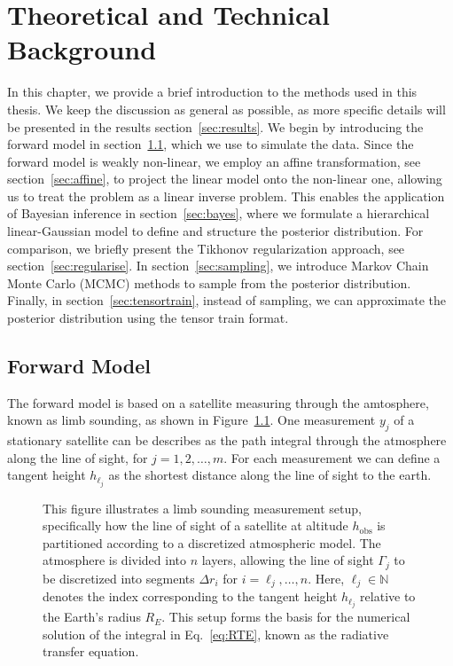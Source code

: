 \chapter{Theoretical and Technical Background}
\label{ch:background}
In this chapter, we provide a brief introduction to the methods used in this thesis. We keep the discussion as general as possible, as more specific details will be presented in the results section~\ref{sec:results}.
We begin by introducing the forward model in section~\ref{sec:formodel}, which we use to simulate the data. Since the forward model is weakly non-linear, we employ an affine transformation, see section~\ref{sec:affine}, to project the linear model onto the non-linear one, allowing us to treat the problem as a linear inverse problem.
This enables the application of Bayesian inference in section~\ref{sec:bayes}, where we formulate a hierarchical linear-Gaussian model to define and structure the posterior distribution.
For comparison, we briefly present the Tikhonov regularization approach, see section~\ref{sec:regularise}.
In section~\ref{sec:sampling}, we introduce Markov Chain Monte Carlo (MCMC) methods to sample from the posterior distribution.
Finally, in section~\ref{sec:tensortrain}, instead of sampling, we can approximate the posterior distribution using the tensor train format.


\section{Forward Model}
\label{sec:formodel}
The forward model is based on a satellite measuring through the amtosphere, known as limb sounding, as shown in Figure~\ref{fig:FirstLIMB}.
One measurement $y_j$ of a stationary satellite can be describes as the path integral through the atmosphere along the line of sight, for $j=1,2,\ldots,m$.
For each measurement we can define a tangent height $h_{\ell_j}$ as the shortest distance along the line of sight to the earth.

\begin{figure}[ht!]
	\centering
	\scalebox{0.9}{}
	\caption[General schematics of measurement setup]{This figure illustrates a limb sounding measurement setup, specifically how the line of sight of a satellite at altitude $h_{\text{obs}}$ is partitioned according to a discretized atmospheric model. The atmosphere is divided into $n$ layers, allowing the line of sight $\Gamma_j$ to be discretized into segments $\Delta r_i$ for $i = \ell_j, \dots, n$.
	Here, $\ell_j \in \mathbb{N}$ denotes the index corresponding to the tangent height $h_{\ell_j}$ relative to the Earth's radius $R_E$. This setup forms the basis for the numerical solution of the integral in Eq.~\ref{eq:RTE}, known as the radiative transfer equation.}
	\label{fig:FirstLIMB}
\end{figure}


